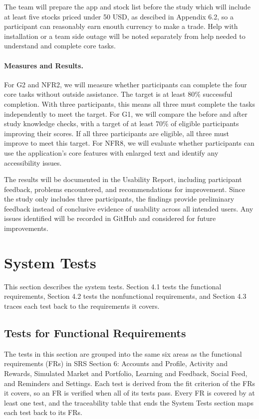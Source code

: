 \documentclass[12pt, titlepage]{article}
\begin{document}
The team will prepare the app and stock list before the study which will include at least five stocks priced under 50 USD, as descibed in Appendix 6.2, so a participant can reasonably earn enouth currency to make a trade. Help with installation or a team side outage will be noted separately from help needed to understand and complete core tasks.


\paragraph{Measures and Results.} For G2 and NFR2, we will measure whether participants can complete the four core tasks without outside assistance. The target is at least 80\% successful completion. With three participants, this means all three must complete the tasks independently to meet the target. For G1, we will compare the before and after study knowledge checks, with a target of at least 70\% of eligible participants improving their scores. If all three participants are eligible, all three must improve to meet this target. For NFR8, we will evaluate whether participants can use the application's core features with enlarged text and identify any accessibility issues.

The results will be documented in the Usability Report, including
participant feedback, problems encountered, and recommendations for
improvement. Since the study only includes three participants, the
findings provide preliminary feedback instead of conclusive
evidence of usability across all intended users. Any issues identified
will be recorded in GitHub and considered for future improvements.
\section{System Tests} \label{SecSystemTests}


This section describes the system tests. Section 4.1 tests the functional
requirements, Section 4.2 tests the nonfunctional requirements, and Section 4.3
traces each test back to the requirements it covers.

\subsection{Tests for Functional Requirements}

The tests in this section are grouped into the same six areas as the
functional requirements (FRs) in SRS Section 6: Accounts and Profile, Activity
and Rewards, Simulated Market and Portfolio, Learning and Feedback, Social
Feed, and Reminders and Settings. Each test is derived from the fit criterion
of the FRs it covers, so an FR is verified when all of its tests pass. Every
FR is covered by at least one test, and the traceability table that ends the
System Tests section maps each test back to its FRs.
\end{document}
